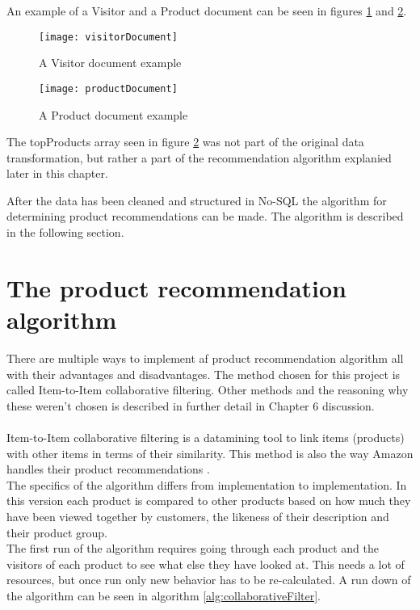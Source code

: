 An example of a Visitor and a Product document can be seen in figures \ref{visitorDoc} and \ref{productDoc}.
\begin{figure}[H]
\centering
\texttt{[image: visitorDocument]}
\caption{A Visitor document example}
\label{visitorDoc}
\end{figure}

\begin{figure}[H]
\centering
\texttt{[image: productDocument]}
\caption{A Product document example}
\label{productDoc}
\end{figure}

The topProducts array seen in figure \ref{productDoc} was not part of the original data transformation, but rather a part of the recommendation algorithm explanied later in this chapter.

After the data has been cleaned and structured in No-SQL the algorithm for determining product recommendations can be made. The algorithm is described in the following section.

\section{The product recommendation algorithm}
There are multiple ways to implement af product recommendation algorithm all with their advantages and disadvantages. The method chosen for this project is called Item-to-Item collaborative filtering. Other methods and the reasoning why these weren't chosen is described in further detail in Chapter 6 discussion. \\\\

Item-to-Item collaborative filtering is a datamining tool to link items (products) with other items in terms of their similarity. This method is also the way \gls{Amazon} handles their product recommendations \cite{AmazonRecommendations}. \\
The specifics of the algorithm differs from implementation to implementation. In this version each product is compared to other products based on how much they have been viewed together by customers, the likeness of their description and their product group. \\
The first run of the algorithm requires going through each product and the visitors of each product to see what else they have looked at. This needs a lot of resources, but once run only new behavior has to be re-calculated. A run down of the algorithm can be seen in algorithm \ref{alg:collaborativeFilter}. \\\\

